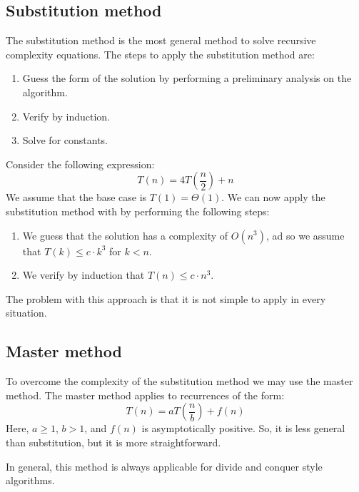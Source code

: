 \subsection{Substitution method}
The substitution method is the most general method to solve recursive complexity equations.
The steps to apply the substitution method are: 
\begin{enumerate}
    \item Guess the form of the solution by performing a preliminary analysis on the algorithm. 
    \item Verify by induction. 
    \item Solve for constants. 
\end{enumerate}
\begin{example}
    Consider the following expression: 
    \[T(n)=4T\left(\frac{n}{2}\right)+n\]
    We assume that the base case is $T(1)=\Theta(1)$. 
    We can now apply the substitution method with by performing the following steps: 
    \begin{enumerate}
        \item We guess that the solution has a complexity of $O(n^3)$, ad so we assume that $T(k)\leq c\cdot k^3$ for $k<n$. 
        \item We verify by induction that $T(n)\leq c\cdot n^3$. 
    \end{enumerate}
\end{example}
The problem with this approach is that it is not simple to apply in every situation. 

\subsection{Master method}
To overcome the complexity of the substitution method we may use the master method. 
The master method applies to recurrences of the form: 
\[T(n)=aT\left(\frac{n}{b}\right)+f(n)\]
Here, $a\geq 1$, $b>1$, and $f(n)$ is asymptotically positive. 
So, it is less general than substitution, but it is more straightforward. 

In general, this method is always applicable for divide and conquer style algorithms. 

